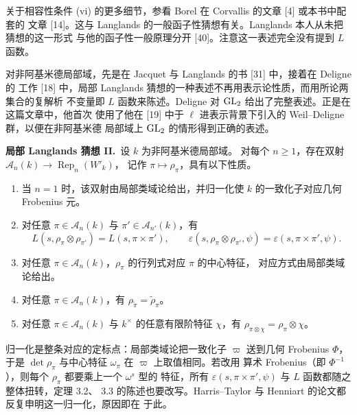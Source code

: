 关于相容性条件 (vi) 的更多细节，参看 Borel 在 Corvallis 的文章 [4] 或本书中配套的
文章 [14]。这与 Langlands 的一般函子性猜想有关。Langlands 本人从未把猜想的这一形式
与他的函子性一般原理分开 [40]。注意这一表述完全没有提到 $L$ 函数。

对非阿基米德局部域，先是在 Jacquet 与 Langlands 的书 [31] 中，接着在 Deligne 的
工作 [18] 中，局部 Langlands 猜想的一种表述不再用表示论性质，而用所论两集合的复解析
不变量即 $L$ 函数来陈述。Deligne 对 $\mathrm{GL}_2$ 给出了完整表述。正是在这篇文章中，他首次
使用了他在 [19] 中于 $\ell$ 进表示背景下引入的 Weil--Deligne 群，以便在非阿基米德
局部域上 $\mathrm{GL}_2$ 的情形得到正确的表述。

\par\medskip\noindent\textbf{局部 Langlands 猜想 II.}\ 设 $k$ 为非阿基米德局部域。
对每个 $n\ge1$，存在双射 $\mathcal{A}_n(k)\to\operatorname{Rep}_n(W'_k)$，
记作 $\pi\mapsto\rho_\pi$，具有以下性质。
\begin{enumerate}[label=(\roman*),leftmargin=*]
  \item 当 $n=1$ 时，该双射由局部类域论给出，并归一化使 $k$ 的一致化子对应几何
    Frobenius 元。
  \item 对任意 $\pi\in\mathcal{A}_n(k)$ 与 $\pi'\in\mathcal{A}_{n'}(k)$，有
    \[
      L(s,\rho_\pi\otimes\rho_{\pi'})=L(s,\pi\times\pi'),\qquad
      \varepsilon(s,\rho_\pi\otimes\rho_{\pi'},\psi)
      =\varepsilon(s,\pi\times\pi',\psi).
    \]
  \item 对任意 $\pi\in\mathcal{A}_n(k)$，$\rho_\pi$ 的行列式对应 $\pi$ 的中心特征，
    对应方式由局部类域论给出。
  \item 对任意 $\pi\in\mathcal{A}_n(k)$，有 $\rho_{\tilde\pi}=\tilde\rho_\pi$。
  \item 对任意 $\pi\in\mathcal{A}_n(k)$ 与 $k^\times$ 的任意有限阶特征 $\chi$，有
    $\rho_{\pi\otimes\chi}=\rho_\pi\otimes\chi$。
\end{enumerate}
\par\medskip
\begin{annote}
归一化是整条对应的定标点：局部类域论把一致化子 $\varpi$ 送到几何 Frobenius
$\Phi$，于是 $\det\rho_\pi$ 与中心特征 $\omega_\pi$ 在 $\varpi$ 上取值相同。若改用
算术 Frobenius（即 $\Phi^{-1}$），则每个 $\rho_\pi$ 都要乘上一个 $\omega^s$ 型的
特征，所有 $\varepsilon(s,\pi\times\pi',\psi)$ 与 $L$ 函数都随之整体扭转，定理 3.2、
3.3 的陈述也要改写。Harris--Taylor 与 Henniart 的论文都反复申明这一归一化，原因即在
于此。
\par{}
\end{annote}

